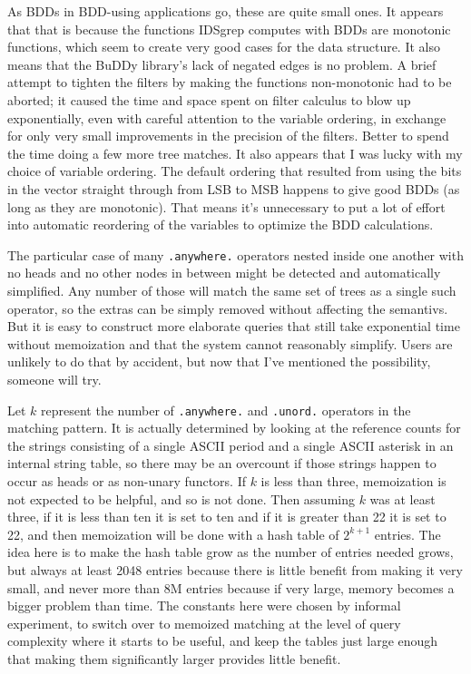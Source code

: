 \documentclass[twocolumn]{report}
\begin{document}
As BDDs in BDD-using applications go, these are quite small ones.  It
appears that that is because the functions IDSgrep computes with BDDs are
monotonic functions, which seem to create very good cases for the data
structure.  It also means that the BuDDy library's lack of negated edges is
no problem.  A brief attempt to tighten the filters by making the functions
non-monotonic had to be aborted; it caused the time and space spent on
filter calculus to blow up exponentially, even with careful attention to the
variable ordering, in exchange for only very small improvements in the
precision of the filters.  Better to spend the time doing a few more tree
matches.  It also appears that I was lucky with my choice of variable
ordering.  The default ordering that resulted from using the bits in the
vector straight through from LSB to MSB happens to give good BDDs (as
long as they are monotonic).  That means it's unnecessary to put a lot of
effort into automatic reordering of the variables to optimize the BDD
calculations.

The particular case of many \texttt{.anywhere.} operators nested inside one
another with no heads and no other nodes in between might be detected and
automatically simplified.  Any number of those will match the same set of
trees as a single such operator, so the extras can be simply removed without
affecting the semantivs.  But it is easy to construct more elaborate queries
that still take exponential time without memoization and that the system
cannot reasonably simplify.  Users are unlikely to do that by accident, but
now that I've mentioned the possibility, someone will try.

Let $k$ represent the number of \texttt{.anywhere.} and \texttt{.unord.}
operators in the matching pattern.  It is actually determined
by looking at the reference counts for the strings consisting of a single
ASCII period and a single ASCII asterisk in an internal string table, so
there may be an overcount if those strings happen to occur as heads or
as non-unary functors.  If $k$ is less than three, memoization is not
expected to be helpful, and so is not done.  Then assuming $k$ was at least
three, if it is less than ten it is set to ten and if it is greater than 22
it is set to 22, and then memoization will be done with a hash table of
$2^{k+1}$ entries.  The idea here is to make the hash table grow as the
number of entries needed grows, but always at least 2048 entries because
there is little benefit from making it very small, and never more than 8M
entries because if very large, memory becomes a bigger problem than time. 
The constants here were chosen by informal experiment, to switch over to
memoized matching at the level of query complexity where it starts to be
useful, and keep the tables just large enough that making them significantly
larger provides little benefit.
\end{document}
